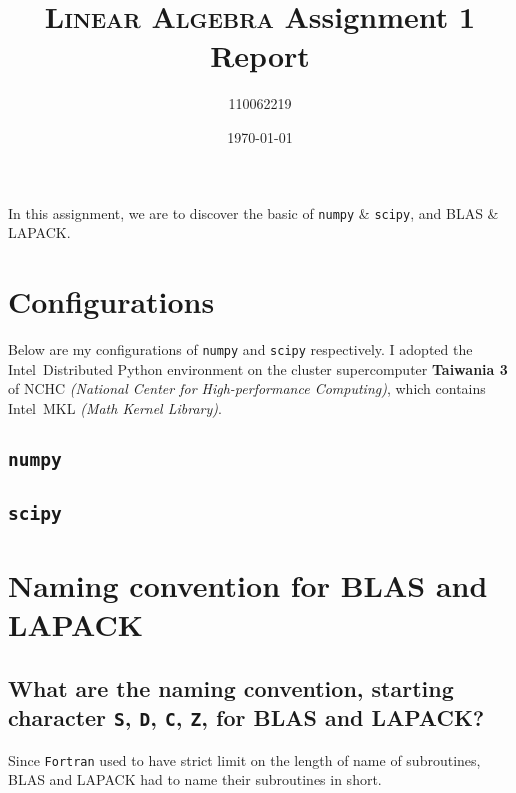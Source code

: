 \documentclass[12pt, a4paper]{article}
\title{\textsc{Linear Algebra} Assignment 1 Report}
\author{110062219}
\date{\today}
\begin{document}
\maketitle

\tableofcontents

In this assignment, we are to discover the basic of \texttt{numpy} \& \texttt{scipy}, and \textsf{BLAS} \& \textsf{LAPACK}.

\section{Configurations}

Below are my configurations of \texttt{numpy} and \texttt{scipy} respectively. I adopted the \textsf{Intel\textregistered\  Distributed Python} environment on the cluster supercomputer \textbf{Taiwania 3} of \textsf{NCHC} \textit{(National Center for High-performance Computing)}, which contains \textsf{Intel\textregistered\ MKL \itshape(Math Kernel Library)}.

\subsection{\texttt{numpy}}



\subsection{\texttt{scipy}}



\section{Naming convention for \textsf{BLAS} and \textsf{LAPACK}}


\subsection{What are the naming convention, starting character \texttt{S}, \texttt{D}, \texttt{C}, \texttt{Z}, for \textsf{BLAS} and \textsf{LAPACK}?}

Since \texttt{Fortran} used to have strict limit on the length of name of subroutines, \textsf{BLAS} and \textsf{LAPACK} had to name their subroutines in short.
\end{document}
